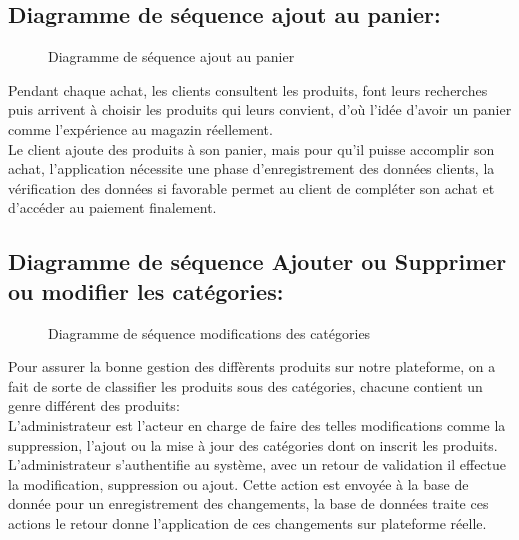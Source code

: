 \documentclass[a4paper]{report}
\begin{document}
\begin{doublespace}
\begin{doublespace}
\begin{doublespace}
\begin{doublespace}
                \subsection{Diagramme de séquence ajout au panier:}
                \begin{figure}[H]
                    \begin{center}
                        \caption{Diagramme de séquence ajout au panier}
                    \end{center}
                \end{figure}
                Pendant chaque achat, les clients consultent les produits,
                font leurs recherches puis arrivent à choisir les produits qui leurs convient,
                d'où l'idée d'avoir un panier comme l'expérience au magazin réellement. \\Le
                client ajoute des produits à son panier, mais pour qu'il puisse accomplir son
                achat, l'application nécessite une phase d'enregistrement des données clients,
                la vérification des données si favorable permet au client de compléter son
                achat et d'accéder au paiement finalement.

                \subsection{Diagramme de séquence Ajouter ou Supprimer ou
                    modifier les catégories:}
                \begin{figure}[H]
                    \begin{center}
                        \caption{Diagramme de séquence modifications des
                            catégories}
                    \end{center}
                \end{figure}
                Pour assurer la bonne gestion des diffèrents produits sur
                notre plateforme, on a fait de sorte de classifier les produits sous des
                catégories, chacune contient un genre différent des produits:\\
                L'administrateur est l'acteur en charge de faire des telles modifications comme
                la suppression, l'ajout ou la mise à jour des catégories dont on inscrit les
                produits. L'administrateur s'authentifie au système, avec un retour de
                validation il effectue la modification, suppression ou ajout. Cette action est
                envoyée à la base de donnée pour un enregistrement des changements, la base de
                données traite ces actions le retour donne l'application de ces changements sur
                plateforme réelle.

\end{doublespace}
\end{doublespace}
\end{doublespace}
\end{doublespace}
\end{document}
